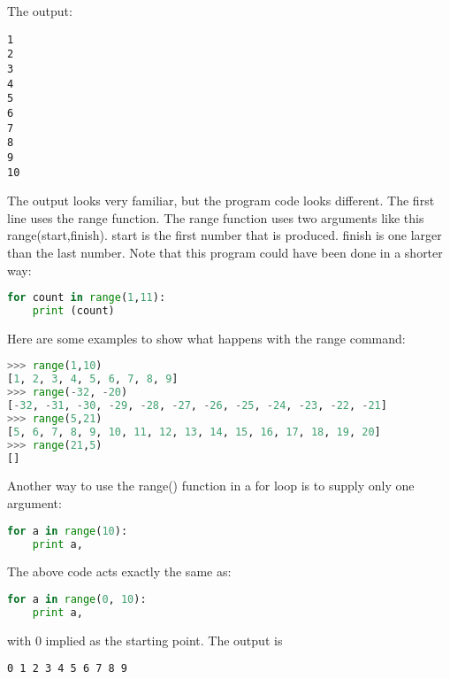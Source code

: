 The output:
\scriptsize
\begin{verbatim}
1
2
3
4
5
6
7
8
9
10
\end{verbatim}
\normalsize

The output looks very familiar, but the program code looks different. The first
line uses the range function. The range function uses two arguments like this
range(start,finish). start is the first number that is produced. finish is one
larger than the last number. Note that this program could have been done in a
shorter way:
\lstset{basicstyle=\scriptsize, numbers=left, captionpos=b, tabsize=4}
\begin{lstlisting}[caption=For Loop Range 2,language={Python},
xleftmargin=15pt, label=lst:forlooprange2]
for count in range(1,11):
    print (count)
\end{lstlisting}

Here are some examples to show what happens with the range command:
\lstset{basicstyle=\scriptsize, numbers=left, captionpos=b, tabsize=4}
\begin{lstlisting}[caption=Range Command 1,language={Python},
xleftmargin=15pt, label=lst:rangecommand1]
>>> range(1,10)
[1, 2, 3, 4, 5, 6, 7, 8, 9]
>>> range(-32, -20)
[-32, -31, -30, -29, -28, -27, -26, -25, -24, -23, -22, -21]
>>> range(5,21)
[5, 6, 7, 8, 9, 10, 11, 12, 13, 14, 15, 16, 17, 18, 19, 20]
>>> range(21,5)
[]
\end{lstlisting}

Another way to use the range() function in a for loop is to supply only one argument:
\lstset{basicstyle=\scriptsize, numbers=left, captionpos=b, tabsize=4}
\begin{lstlisting}[caption=Range Command 2,language={Python},
xleftmargin=15pt, label=lst:rangecommand2]
for a in range(10):
    print a,
\end{lstlisting}

The above code acts exactly the same as:
\lstset{basicstyle=\scriptsize, numbers=left, captionpos=b, tabsize=4}
\begin{lstlisting}[caption=Range Command 3,language={Python},
xleftmargin=15pt, label=lst:rangecommand3]
for a in range(0, 10):
    print a,
\end{lstlisting}

with 0 implied as the starting point. The output is
\scriptsize
\begin{verbatim}
0 1 2 3 4 5 6 7 8 9
\end{verbatim}
\normalsize


